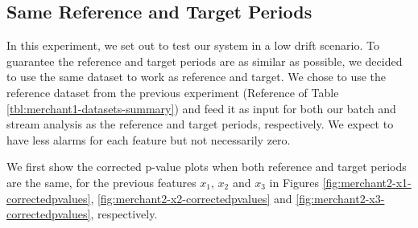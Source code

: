 \subsection{Same Reference and Target Periods}
In this experiment, we set out to test our system in a low drift scenario. To guarantee the reference and target periods are as similar as possible, we decided to use the same dataset to work as reference and target. We chose to use the reference dataset from the previous experiment (Reference of Table \ref{tbl:merchant1-datasets-summary}) and feed it as input for both our batch and stream analysis as the reference and target periods, respectively. We expect to have less alarms for each feature but not necessarily zero.

We first show the corrected p-value plots when both reference and target periods are the same, for the previous features $x_1$, $x_2$ and $x_3$ in Figures \ref{fig:merchant2-x1-correctedpvalues}, \ref{fig:merchant2-x2-correctedpvalues} and \ref{fig:merchant2-x3-correctedpvalues}, respectively. 

